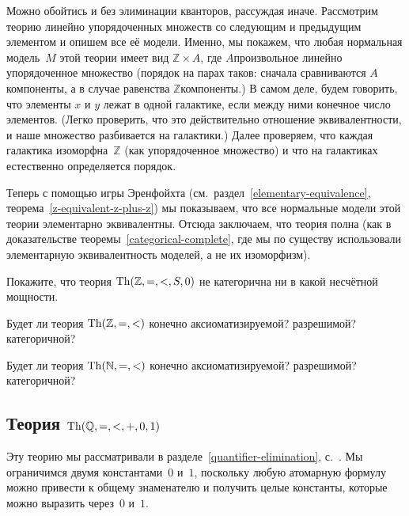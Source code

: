 Можно обойтись и без элиминации кванторов, рассуждая иначе.
Рассмотрим теорию линейно упорядоченных множеств со
следующим и предыдущим элементом и опишем все её модели. Именно,
мы покажем, что любая нормальная
модель~$M$ этой теории имеет вид
$\mathbb{Z}\times A$, где $A$\т произвольное линейно
упорядоченное множество (порядок на парах таков: сначала
сравниваются $A$\д компоненты, а в случае равенства\т
$\mathbb{Z}$\д компоненты.) В самом деле, будем говорить, что
элементы $x$ и $y$ лежат  в одной галактике, если между
ними конечное число элементов. (Легко проверить, что это
действительно отношение эквивалентности, и наше множество
разбивается на галактики.)  Далее проверяем, что каждая
галактика изоморфна~$\mathbb{Z}$ (как упорядоченное множество)
и что на галактиках естественно определяется порядок.

Теперь с помощью игры Эренфойхта
(см.~раздел~\ref{elementary-equivalence},
теорема~\ref{z-equivalent-z-plus-z}) мы показываем, что все
нормальные модели этой теории элементарно эквивалентны. Отсюда
заключаем, что теория полна (как в доказательстве
теоремы~\ref{categorical-complete}, где мы по существу
использовали элементарную эквивалентность моделей, а не их
изоморфизм).

\begin{problem}
Покажите, что теория $\operatorname{Th}(\mathbb{Z},{=},{<},S,0)$ не
категорична ни в какой несчётной мощности.
\end{problem}

\begin{problem}
Будет ли теория $\operatorname{Th}(\mathbb{Z},{=},{<})$ конечно аксиоматизируемой?
разрешимой? категоричной?
\end{problem}

\begin{problem}
Будет ли теория $\operatorname{Th}(\mathbb{N},{=},{<})$ конечно аксиоматизируемой?
разрешимой? категоричной?
\end{problem}

\subsection*{Теория $\operatorname{Th}(\mathbb{Q},{=},{<},{+},0,1)$}
%
Эту теорию мы рассматривали в
разделе~\ref{quantifier-elimination},
с.~\pageref{q-plus-order-elimination}. Мы ограничимся двумя
константами~$0$ и~$1$, поскольку любую атомарную формулу можно
привести к общему знаменателю и получить целые константы,
которые можно выразить через~$0$ и~$1$.

